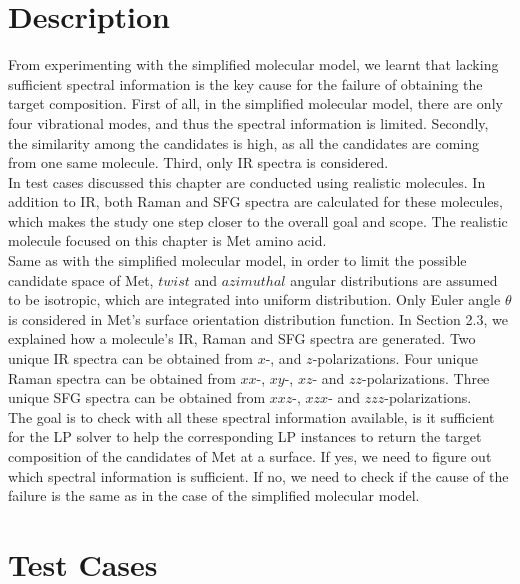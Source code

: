  \label{ch:4}
\section{Description}

From experimenting with the simplified molecular model, we learnt that lacking sufficient spectral information is the key cause for the failure of obtaining the target composition. First of all, in the simplified molecular model, there are only four vibrational modes, and thus the spectral information is limited. Secondly, the similarity among the candidates is high, as all the candidates are coming from one same molecule. Third, only IR spectra is considered. \\

In test cases discussed this chapter are conducted using realistic molecules. In addition to IR, both Raman and SFG spectra are calculated for these molecules, which makes the study one step closer to the overall goal and scope. The realistic molecule focused on this chapter is Met amino acid. \\

Same as with the simplified molecular model, in order to limit the possible candidate space of Met, $twist$ and $azimuthal$ angular distributions are assumed to be isotropic, which are integrated into uniform distribution. Only Euler angle $\theta$ is considered in Met's surface orientation distribution function. In Section 2.3, we explained how a molecule's IR, Raman and SFG spectra are generated. Two unique IR spectra can be obtained from $x$-, and $z$-polarizations. Four unique Raman spectra can be obtained from $xx$-, $xy$-, $xz$- and $zz$-polarizations. Three unique SFG spectra can be obtained from $xxz$-, $xzx$- and $zzz$-polarizations.\\

The goal is to check with all these spectral information available, is it sufficient for the LP solver to help the corresponding LP instances to return the target composition of the candidates of Met at a surface. If yes, we need to figure out which spectral information is sufficient. If no, we need to check if the cause of the failure is the same as in the case of the simplified molecular model. \\

\section{Test Cases}

